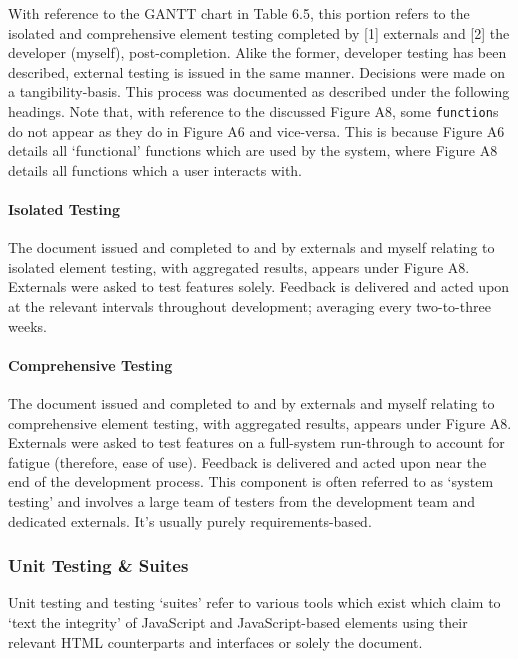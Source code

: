 \documentclass[11pt, english]{article}
\begin{document}
	With reference to the GANTT chart in Table 6.5, this portion refers to the isolated and comprehensive element testing completed by [1] externals and [2] the developer (myself), post-completion. Alike the former, developer testing has been described, external testing is issued in the same manner. Decisions were made on a tangibility-basis. This process was documented as described under the following headings. Note that, with reference to the discussed Figure A8, some \texttt{function}s do not appear as they do in Figure A6 and vice-versa. This is because Figure A6 details all `functional' functions which are used by the system, where Figure A8 details all functions which a user interacts with.

			\paragraph{Isolated Testing}

	The document issued and completed to and by externals and myself relating to isolated element testing, with aggregated results, appears under Figure A8. Externals were asked to test features solely. Feedback is delivered and acted upon at the relevant intervals throughout development; averaging every two-to-three weeks.

			\paragraph{Comprehensive Testing}

	The document issued and completed to and by externals and myself relating to comprehensive element testing, with aggregated results, appears under Figure A8. Externals were asked to test features on a full-system run-through to account for fatigue (therefore, ease of use). Feedback is delivered and acted upon near the end of the development process. This component is often referred to as `system testing' and involves a large team of testers from the development team and dedicated externals. It's usually purely requirements-based.

		\subsubsection{Unit Testing \& Suites}

	Unit testing and testing `suites' refer to various tools which exist which claim to `text the integrity' of JavaScript and JavaScript-based elements using their relevant HTML counterparts and interfaces or solely the document.
\end{document}
